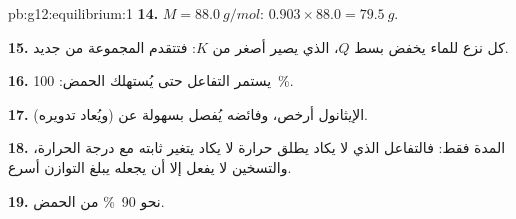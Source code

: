 \begin{solution}{pb:g12:equilibrium:1}
\textbf{14.} $M = \qty{88.0}{g/mol}$: $0.903 \times 88.0 = \qty{79.5}{g}$.

\textbf{15.} كل نزع للماء يخفض بسط $Q$، الذي
يصير أصغر من $K$: فتتقدم المجموعة من جديد.

\textbf{16.} يستمر التفاعل حتى يُستهلك الحمض:
\qty{100}{\percent}.

\textbf{17.} الإيثانول أرخص، وفائضه يُفصل بسهولة عن
 (ويُعاد تدويره).

\textbf{18.} المدة فقط: فالتفاعل الذي لا يكاد يطلق حرارة
لا يكاد يتغير ثابته مع درجة الحرارة، والتسخين لا يفعل إلا أن
يجعله يبلغ التوازن أسرع.

\textbf{19.} نحو \qty{90}{\percent} من الحمض.
\end{solution}
